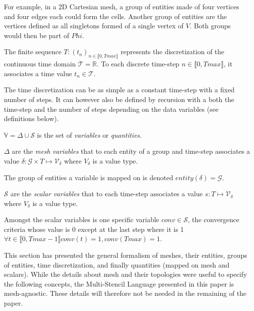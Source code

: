 For example, in a 2D Cartesian mesh, a group of entities made of four vertices and four edges each could form the cells.
Another group of entities are the vertices defined as all singletons formed of a single vertex of $V$.
Both groups would then be part of $Phi$.

\medskip

\begin{mydef}
The finite sequence $T: (t_n)_{n\in\llbracket 0, Tmax \rrbracket}$ represents the discretization of the continuous time domain $\mathcal{T}=\mathbb{R}$.
To each discrete time-step $n\in\llbracket 0, Tmax \rrbracket$, it associates a time value $t_n\in\mathcal{T}$.
\end{mydef}

The time discretization can be as simple as a constant time-step with a fixed number of steps.
It can however also be defined by recursion with a both the time-step and the number of steps depending on the data variables (see definitions below).

\medskip

\begin{mydefs}
\item $\mathbb{V}=\Delta\cup\mathcal{S}$ is the set of \emph{variables} or \emph{quantities}.
\item $\Delta$ are the \textit{mesh variables} that to each entity of a group and time-step associates a value $\delta: \mathcal{G}\times T\mapsto \mathcal{V}_\delta$ where $V_{\delta}$ is a value type.
\item The group of entities a variable is mapped on is denoted $entity(\delta)=\mathcal{G}$.
\item $\mathcal{S}$ are the \textit{scalar variables} that to each time-step associates a value $s: T\mapsto \mathcal{V}_\delta$ where $V_{\delta}$ is a value type.
\item Amongst the scalar variables is one specific variable $conv\in\mathcal{S}$, the convergence criteria whose value is $0$ except at the last step where it is 1 $\forall t\in \llbracket 0, Tmax-1 \rrbracket conv(t)=1, conv(Tmax)=1$.
\end{mydefs}


\medskip

This section has presented the general formalism of meshes, their entities, groups of entities, time discretization, and finally quantities (mapped on mesh and scalars).
While the details about mesh and their topologies were useful to specify the following concepts, the Multi-Stencil Language presented in this paper is mesh-agnostic.
These details will therefore not be needed in the remaining of the paper.

